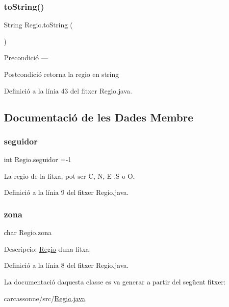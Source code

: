 \subsubsection{\texorpdfstring{to\+String()}{toString()}}
{\footnotesize\ttfamily String Regio.\+to\+String (\begin{DoxyParamCaption}{ }\end{DoxyParamCaption})}

\begin{DoxyPrecond}{Precondició}
--- 
\end{DoxyPrecond}
\begin{DoxyPostcond}{Postcondició}
retorna la regio en string 
\end{DoxyPostcond}


Definició a la línia 43 del fitxer Regio.\+java.



\subsection{Documentació de les Dades Membre}
\mbox{\label{class_regio_a8f06cf427e362e9c5ed9200342656e76}} 
\subsubsection{\texorpdfstring{seguidor}{seguidor}}
{\footnotesize\ttfamily int Regio.\+seguidor =-\/1\hspace{0.3cm}{\ttfamily [private]}}



La regio de la fitxa, pot ser C, N, E ,S o O. 



Definició a la línia 9 del fitxer Regio.\+java.

\mbox{\label{class_regio_a6127a89be76e0428032433698b959c6b}} 
\subsubsection{\texorpdfstring{zona}{zona}}
{\footnotesize\ttfamily char Regio.\+zona\hspace{0.3cm}{\ttfamily [private]}}



Descripcio\+: \mbox{\hyperlink{class_regio}{Regio}} d\textquotesingle{}una fitxa. 



Definició a la línia 8 del fitxer Regio.\+java.



La documentació d\textquotesingle{}aquesta classe es va generar a partir del següent fitxer\+:\begin{DoxyCompactItemize}
\item 
carcassonne/src/\mbox{\hyperlink{_regio_8java}{Regio.\+java}}\end{DoxyCompactItemize}
